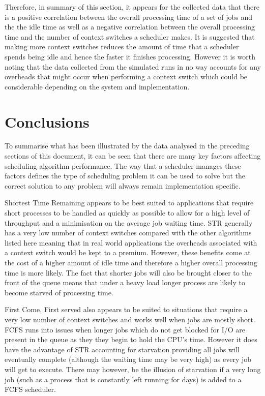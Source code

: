 \documentclass{acm_proc_article-sp}
\begin{document}
Therefore, in summary of this section, it appears for the collected data that there is a positive correlation between the overall processing time of a set of jobs and the the idle time as well as a negative correlation between the overall processing time and the number of context switches a scheduler makes. It is suggested that making more context switches reduces the amount of time that a scheduler spends being idle and hence the faster it finishes processing. However it is worth noting that the data collected from the simulated runs in no way accounts for any overheads that might occur when performing a context switch which could be considerable depending on the system and implementation.

\section{Conclusions}
To summarise what has been illustrated by the data analysed in the preceding sections of this document, it can be seen that there are many key factors affecting scheduling algorithm performance. The way that a scheduler manages these factors defines the type of scheduling problem it can be used to solve but the correct solution to any problem will always remain implementation specific.

Shortest Time Remaining appears to be best suited to applications that require short processes to be handled as quickly as possible to allow for a high level of throughput and a minimisation on the average job waiting time. STR generally has a very low number of context switches compared with the other algorithms listed here meaning that in real world applications the overheads associated with a context switch would be kept to a premium. However, these benefits come at the cost of a higher amount of idle time and therefore a higher overall processing time is more likely. The fact that shorter jobs will also be brought closer to the front of the queue means that under a heavy load longer process are likely to become starved of processing time.

First Come, First served also appears to be suited to situations that require a very low number of context switches and works well when jobs are mostly short. FCFS runs into issues when longer jobs which do not get blocked for I/O are present in the queue as they they begin to hold the CPU's time. However it does have the advantage of STR accounting for starvation providing all jobs will eventually complete (although the waiting time may be very high) as every job will get to execute. There may however, be the illusion of starvation if a very long job (such as a process that is constantly left running for days) is added to a FCFS scheduler.
\end{document}
